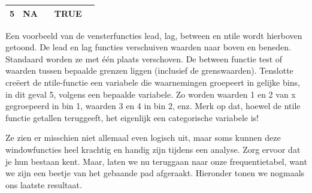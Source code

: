 \documentclass[]{tufte-book}
\newenvironment{Shaded}{}{}
\newcommand{\DataTypeTok}[1]{\textcolor[rgb]{0.56,0.13,0.00}{#1}}
\newcommand{\KeywordTok}[1]{\textcolor[rgb]{0.00,0.44,0.13}{\textbf{#1}}}
\newcommand{\NormalTok}[1]{#1}
\newcommand{\OperatorTok}[1]{\textcolor[rgb]{0.40,0.40,0.40}{#1}}
\newcommand{\StringTok}[1]{\textcolor[rgb]{0.25,0.44,0.63}{#1}}
\begin{document}
\begin{longtable}[]{@{}ccccc@{}}
\begin{minipage}[t]{0.06\columnwidth}
5\strut
\end{minipage} & \begin{minipage}[t]{0.08\columnwidth}\centering
NA\strut
\end{minipage} & \begin{minipage}[t]{0.07\columnwidth}\centering
4\strut
\end{minipage} & \begin{minipage}[t]{0.23\columnwidth}\centering
TRUE\strut
\end{minipage} & \begin{minipage}[t]{0.17\columnwidth}\centering
3\strut
\end{minipage}\tabularnewline
\bottomrule
\end{longtable}

Een voorbeeld van de vensterfuncties lead, lag, between en ntile wordt hierboven getoond. De lead en lag functies verschuiven waarden naar boven en beneden. Standaard worden ze met één plaats verschoven. De between functie test of waarden tussen bepaalde grenzen liggen (inclusief de grenswaarden). Tenslotte creëert de ntile-functie een variabele die waarnemingen groepeert in gelijke bins, in dit geval 5, volgens een bepaalde variabele. Zo worden waarden 1 en 2 van x gegroepeerd in bin 1, waarden 3 en 4 in bin 2, enz. Merk op dat, hoewel de ntile functie getallen teruggeeft, het eigenlijk een categorische variabele is!

Ze zien er misschien niet allemaal even logisch uit, maar soms kunnen deze windowfuncties heel krachtig en handig zijn tijdens een analyse. Zorg ervoor dat je hun bestaan kent. Maar, laten we nu teruggaan naar onze frequentietabel, want we zijn een beetje van het gebaande pad afgeraakt. Hieronder tonen we nogmaals ons laatste resultaat.

\begin{Shaded}
\end{Shaded}
\end{document}
